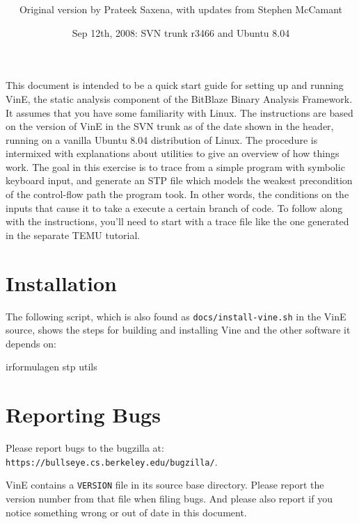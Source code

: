 \documentclass[11pt,onecolumn]{article}
\title{\mbox{}\\[-.8in]\bf \titled}
\author{Original version by Prateek Saxena, with updates from Stephen McCamant}
\date{Sep 12th, 2008: SVN trunk r3466 and Ubuntu 8.04}
\begin{document}
\maketitle

This document is intended to be a quick start guide for setting up and
running VinE, the static analysis component of the BitBlaze Binary
Analysis Framework. It assumes that you have some familiarity with
Linux.  The instructions are based on the version of VinE in the SVN
trunk as of the date shown in the header, running on a vanilla Ubuntu
8.04 distribution of Linux.  The procedure is intermixed with
explanations about utilities to give an overview of how things
work. The goal in this exercise is to trace from a simple program with
symbolic keyboard input, and generate an STP file which models the
weakest precondition of the control-flow path the program took. In
other words, the conditions on the inputs that cause it to take a
execute a certain branch of code. To follow along with the
instructions, you'll need to start with a trace file like the one
generated in the separate TEMU tutorial.

\section {Installation}
\label{sec:install}

The following script, which is also found as
\verb'docs/install-vine.sh' in the VinE source, shows the steps for
building and installing Vine and the other software it depends on:


 {irformulagen}
 {stp}
 {utils}


\section {Reporting Bugs}

Please report bugs to the bugzilla at:
\texttt{https://bullseye.cs.berkeley.edu/bugzilla/}.

VinE contains a \texttt{VERSION} file in its source base
directory. Please report the version number from that file when filing
bugs. And please also report if you notice something wrong or out of
date in this document.
\end{document}
